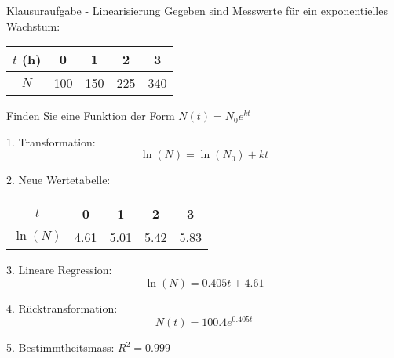 \begin{example2}{Klausuraufgabe - Linearisierung}
Gegeben sind Messwerte für ein exponentielles Wachstum:
\begin{center}
\begin{tabular}{|c|c|c|c|c|}
\hline
$t$ (h) & 0 & 1 & 2 & 3 \\
\hline
$N$ & 100 & 150 & 225 & 340 \\
\hline
\end{tabular}
\end{center}

Finden Sie eine Funktion der Form $N(t) = N_0 e^{kt}$

1. Transformation:
   $$\ln(N) = \ln(N_0) + kt$$

2. Neue Wertetabelle:
\begin{center}
\begin{tabular}{|c|c|c|c|c|}
\hline
$t$ & 0 & 1 & 2 & 3 \\
\hline
$\ln(N)$ & 4.61 & 5.01 & 5.42 & 5.83 \\
\hline
\end{tabular}
\end{center}

3. Lineare Regression:
   $$\ln(N) = 0.405t + 4.61$$

4. Rücktransformation:
   $$N(t) = 100.4 e^{0.405t}$$

5. Bestimmtheitsmass: $R^2 = 0.999$
\end{example2}